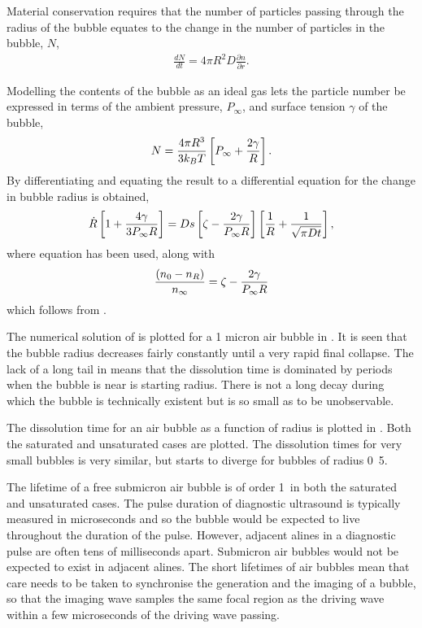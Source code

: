 Material conservation requires that the number of particles passing through the radius of the bubble
equates to the change in the number of particles in the bubble, $N$,
\begin{align}
  \frac{dN}{dt} =4 \pi R^2 D\frac{\partial n}{\partial r}.
\label{eqn:nuc:materialCons}
\end{align}

Modelling the contents of the bubble as an ideal gas lets the particle number be expressed in terms of the ambient pressure, $P_\infty$, and surface tension $\gamma$ of the bubble,
\begin{align}
  N = \frac{4\pi R^3 }{3k_B T} \left[ P_\infty + \frac{2\gamma}{R} \right].
  \label{eqn:nuc:ParticleNumber}
\end{align}
By differentiating  and equating the result to  a differential equation for the change in bubble radius is obtained,
\begin{align}
   \dot{R}\left[  1+ \frac{4\gamma}{3 P_\infty R} \right] = Ds\left[  \zeta - \frac{2\gamma}{P_\infty R} \right]\left[ \frac{1}{R} + \frac{1}{\sqrt{\pi D t}} \right],
   \label{eqn:nuc:Rdot}
\end{align}
where equation  has been used, along with
\begin{align}
  \frac{\left( n_0 - n_R \right)}{n_\infty} = \zeta - \frac{2\gamma}{P_\infty R}
  \label{eqn:nuc:dissolve}
\end{align}
which follows from .






The numerical solution of  is plotted for a 1 micron air bubble in .
It is seen that the bubble radius decreases fairly constantly until a very rapid final collapse.
The lack of a long tail in 
means that the dissolution time is dominated by periods when the bubble is near is starting radius.
There is not a long decay during which the bubble is technically existent but is so small as to be unobservable.

The dissolution time for an air bubble as a function of radius is plotted in .
Both the saturated and unsaturated cases are plotted.
The dissolution times for very small bubbles is very similar,
but starts to diverge for bubbles of radius \unit{0.5}\micro\metre.

The lifetime of a free submicron air bubble is of order \unit{1}\milli\second\ in both the  saturated and unsaturated cases.
The pulse duration of diagnostic ultrasound is typically measured in microseconds and so the bubble would be expected to live throughout the duration of the pulse.
However, adjacent alines in a diagnostic pulse are often tens of milliseconds apart.
Submicron air bubbles would not be expected to exist in adjacent alines.
The short lifetimes of air bubbles mean that care needs to be taken to synchronise the generation and the imaging of a bubble,
so that the imaging wave samples the same focal region as the driving wave within a few microseconds of the driving wave passing.


